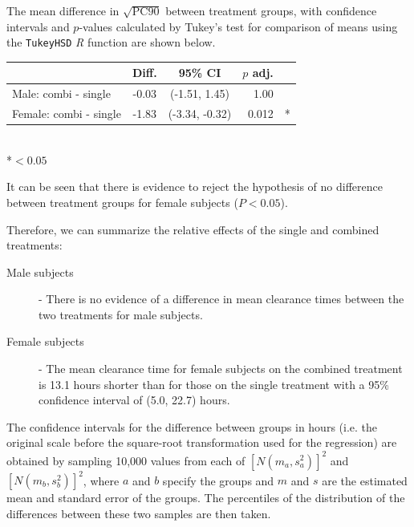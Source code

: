 The mean difference in $\sqrt{\mathrm{PC}90}$ between treatment groups, with confidence intervals and $p$-values calculated by Tukey's test for comparison of means \cite{montgomery} using the \texttt{TukeyHSD} \emph{R} function are shown below.
\begin{table}[h]
\centering
\begin{tabular}{l|ccrl}
&Diff.&95\% CI&$p$ adj.&\\
\hline
Male: combi - single 	& -0.03 & (-1.51, 1.45) & 1.00 &\\
Female: combi - single	& -1.83 & (-3.34,  -0.32) & 0.012 &*\\
\end{tabular}\\
*$<0.05$
\end{table}

It can be seen that there is evidence to reject the hypothesis of no difference between treatment groups for female subjects ($P<0.05$).

\newpage
Therefore, we can summarize the relative effects of the single and combined treatments:
\begin{description}
\item[Male subjects] - There is no evidence of a difference in mean clearance times between the two treatments for male subjects.
\item[Female subjects] - The mean clearance time for female subjects on the combined treatment is 13.1 hours shorter than for those on the single treatment with a 95\% confidence interval of (5.0, 22.7) hours.
\end{description}

The confidence intervals for the difference between groups in hours (i.e. the original scale before the square-root transformation used for the regression) are obtained by sampling 10,000 values from each of $[N(m_{a},s_{a}^{2})]^{2}$ and $[N(m_{b},s_{b}^{2})]^{2}$, where $a$ and $b$ specify the groups and $m$ and $s$ are the estimated mean and standard error of the groups. The percentiles of the distribution of the differences between these two samples are then taken.

